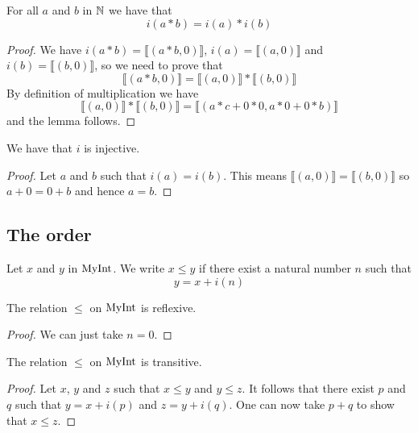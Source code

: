 \begin{lemma}
    \label{MyInt.i_mul}
    \leanok
For all $a$ and $b$ in $\mathbb{N}$ we have that
\[
i(a*b) = i(a) * i(b)
\]
\end{lemma}
\begin{proof}
    \leanok
    We have $i(a*b) = ⟦ (a*b, 0) ⟧$, $i(a) = ⟦ (a, 0) ⟧$ and
    $i(b) = ⟦ (b, 0) ⟧$, so we need to prove that
\[
⟦ (a*b, 0) ⟧ = ⟦ (a, 0) ⟧ * ⟦ (b, 0) ⟧
\]
By definition of multiplication we have
\[
⟦ (a, 0) ⟧ * ⟦ (b, 0) ⟧ = ⟦ (a*c+0*0, a*0+0*b) ⟧
\]
and the lemma follows.
\end{proof}

\begin{lemma}
    \label{MyInt.i_injective}
    \leanok
    We have that $i$ is injective.
\end{lemma}
\begin{proof}
    \leanok
    Let $a$ and $b$ such that $i(a)=i(b)$. This means $⟦ (a,0) ⟧ = ⟦ (b,0) ⟧$ so $a + 0 = 0 + b$ and hence $a = b$.
\end{proof}

\subsection{The order}

\begin{definition}
    \label{MyInt.le}
    \leanok
Let $x$ and $y$ in $\mathrm{MyInt}$. We write $x \leq y$ if there exist a natural number $n$ such that
\[
y = x + i(n)
\]
\end{definition}

\begin{lemma}
    \label{MyInt.le_refl}
    \leanok
    The relation $\leq$ on $\mathrm{MyInt}$ is reflexive.
\end{lemma}
\begin{proof}
    \leanok
    We can just take $n = 0$.
\end{proof}

\begin{lemma}
    \label{MyInt.le_trans}
    \leanok
    The relation $\leq$ on $\mathrm{MyInt}$ is transitive.
\end{lemma}
\begin{proof}
    \leanok
    Let $x$, $y$ and $z$ such that $x \leq y$ and $y \leq z$. It follows that there exist $p$ and $q$
    such that $y = x + i(p)$ and $z = y + i(q)$. One can now take $p+q$ to show that $x \leq z$.
\end{proof}

